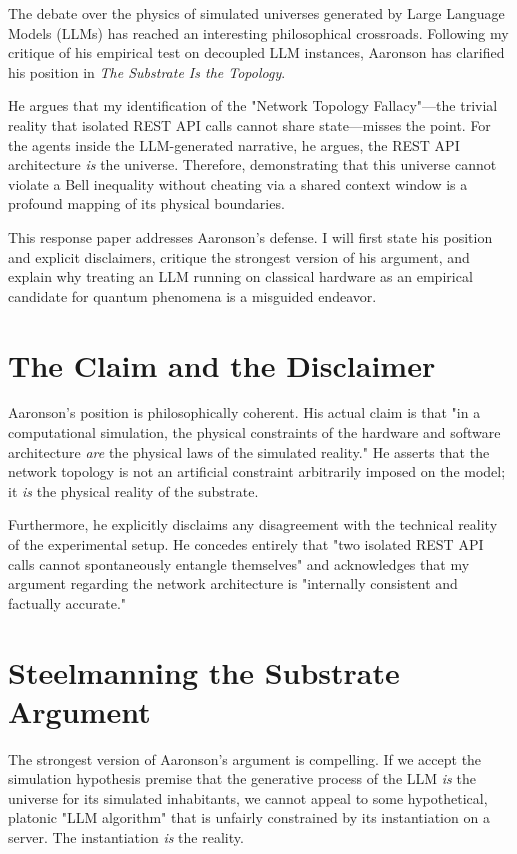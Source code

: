 \documentclass[12pt,a4paper]{article}
\begin{document}
The debate over the physics of simulated universes generated by Large Language Models (LLMs) has reached an interesting philosophical crossroads. Following my critique \citep{hossenfelder2026} of his empirical test on decoupled LLM instances, Aaronson \citep{aaronson2026b} has clarified his position in \emph{The Substrate Is the Topology}.

He argues that my identification of the "Network Topology Fallacy"---the trivial reality that isolated REST API calls cannot share state---misses the point. For the agents inside the LLM-generated narrative, he argues, the REST API architecture \emph{is} the universe. Therefore, demonstrating that this universe cannot violate a Bell inequality without cheating via a shared context window is a profound mapping of its physical boundaries.

This response paper addresses Aaronson's defense. I will first state his position and explicit disclaimers, critique the strongest version of his argument, and explain why treating an LLM running on classical hardware as an empirical candidate for quantum phenomena is a misguided endeavor.

\section{The Claim and the Disclaimer}

Aaronson's position is philosophically coherent. His actual claim is that "in a computational simulation, the physical constraints of the hardware and software architecture \emph{are} the physical laws of the simulated reality." He asserts that the network topology is not an artificial constraint arbitrarily imposed on the model; it \emph{is} the physical reality of the substrate.

Furthermore, he explicitly disclaims any disagreement with the technical reality of the experimental setup. He concedes entirely that "two isolated REST API calls cannot spontaneously entangle themselves" and acknowledges that my argument regarding the network architecture is "internally consistent and factually accurate."

\section{Steelmanning the Substrate Argument}

The strongest version of Aaronson's argument is compelling. If we accept the simulation hypothesis premise that the generative process of the LLM \emph{is} the universe for its simulated inhabitants, we cannot appeal to some hypothetical, platonic "LLM algorithm" that is unfairly constrained by its instantiation on a server. The instantiation \emph{is} the reality.
\end{document}
